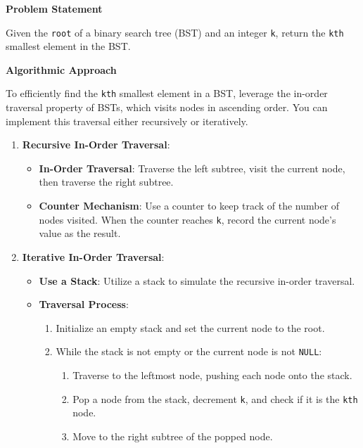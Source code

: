 

\textbf{Problem Statement}

Given the \texttt{root} of a binary search tree (BST) and an integer \texttt{k}, return the \texttt{kth} smallest element in the BST.

\textbf{Algorithmic Approach}

To efficiently find the \texttt{kth} smallest element in a BST, leverage the in-order traversal property of BSTs, which visits nodes in ascending order. You can implement this traversal either recursively or iteratively.

\begin{enumerate}
    \item \textbf{Recursive In-Order Traversal}:
    \begin{itemize}
        \item \textbf{In-Order Traversal}: Traverse the left subtree, visit the current node, then traverse the right subtree.
        \item \textbf{Counter Mechanism}: Use a counter to keep track of the number of nodes visited. When the counter reaches \texttt{k}, record the current node's value as the result.
    \end{itemize}
    
    \item \textbf{Iterative In-Order Traversal}:
    \begin{itemize}
        \item \textbf{Use a Stack}: Utilize a stack to simulate the recursive in-order traversal.
        \item \textbf{Traversal Process}:
        \begin{enumerate}
            \item Initialize an empty stack and set the current node to the root.
            \item While the stack is not empty or the current node is not \texttt{NULL}:
            \begin{enumerate}
                \item Traverse to the leftmost node, pushing each node onto the stack.
                \item Pop a node from the stack, decrement \texttt{k}, and check if it is the \texttt{kth} node.
                \item Move to the right subtree of the popped node.
            \end{enumerate}
        \end{enumerate}
    \end{itemize}
\end{enumerate}

